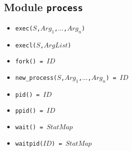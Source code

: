 \documentclass[10pt]{article}
\begin{document}
\begin{multicols}{2}
{\section*{Module \texttt{process}}
\begin{scriptsize}
\begin{itemize}
    \item \texttt{exec($S$,$Arg_1$,$\ldots$,$Arg_n$)}
    \item \texttt{execl($S$,$ArgList$)}
    \item \texttt{fork() = $ID$}
    \item \texttt{new\_process($S$,$Arg_1$,$\ldots$,$Arg_n$) = $ID$}
    \item \texttt{pid() = $ID$}
    \item \texttt{ppid() = $ID$}
    \item \texttt{wait() = $StatMap$}
    \item \texttt{waitpid($ID$) = $StatMap$}
\end{itemize}
\end{scriptsize}
}
\end{multicols}
\end{document}
